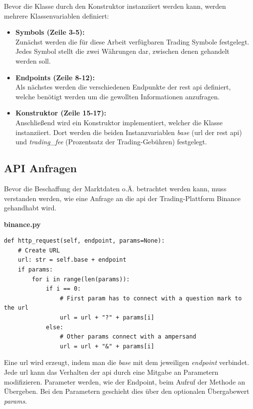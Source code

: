 \documentclass[oneside]{ausarbeitung}
\begin{document}
Bevor die Klasse durch den Konstruktor instanziiert werden kann, werden mehrere Klassenvariablen definiert: \\
\begin{itemize}
	\item \textbf{Symbols (Zeile 3-5):} \\
		Zunächst werden die für diese Arbeit verfügbaren Trading Symbole
		festgelegt. Jedes Symbol stellt die zwei Währungen dar, zwischen denen
		gehandelt werden soll.
	\item \textbf{Endpoints (Zeile 8-12):} \\
		Als nächstes werden die verschiedenen Endpunkte der \ac{rest} \ac{api}
		definiert, welche benötigt werden um die gewollten Informationen
		anzufragen.
	\item \textbf{Konstruktor (Zeile 15-17):} \\
		Anschließend wird ein Konstruktor implementiert, welcher die Klasse 
		instanziiert. Dort werden die beiden Instanzvariablen \textit{base} 
		(\ac{url} der \ac{rest} \ac{api}) und \textit{trading\_fee} (Prozentsatz 
		der Trading-Gebühren) festgelegt. 	

\end{itemize}
\subsection{API Anfragen}
\label{sub:api_anfragen}

Bevor die Beschaffung der Marktdaten o.Ä. betrachtet werden kann, muss verstanden werden, wie eine Anfrage an die \ac{api} der Trading-Plattform Binance gehandhabt wird.

\lstset{language=Python}
\lstset{frame=lines}
\lstset{basicstyle=\footnotesize}
\textbf{binance.py}
\begin{lstlisting}
def http_request(self, endpoint, params=None):
	# Create URL
	url: str = self.base + endpoint
	if params:
		for i in range(len(params)):
			if i == 0:
				# First param has to connect with a question mark to the url
				url = url + "?" + params[i]
			else:
				# Other params connect with a ampersand
				url = url + "&" + params[i]
\end{lstlisting}

Eine \ac{url} wird erzeugt, indem man die \textit{base} mit dem jeweiligen \textit{endpoint} verbindet. Jede \ac{url} kann das Verhalten der \ac{api} durch eine Mitgabe an Parametern modifizieren. Parameter werden, wie der Endpoint, beim Aufruf der Methode an Übergeben. Bei den Parametern geschieht dies über den optionalen Übergabewert \textit{params}. 
\end{document}
